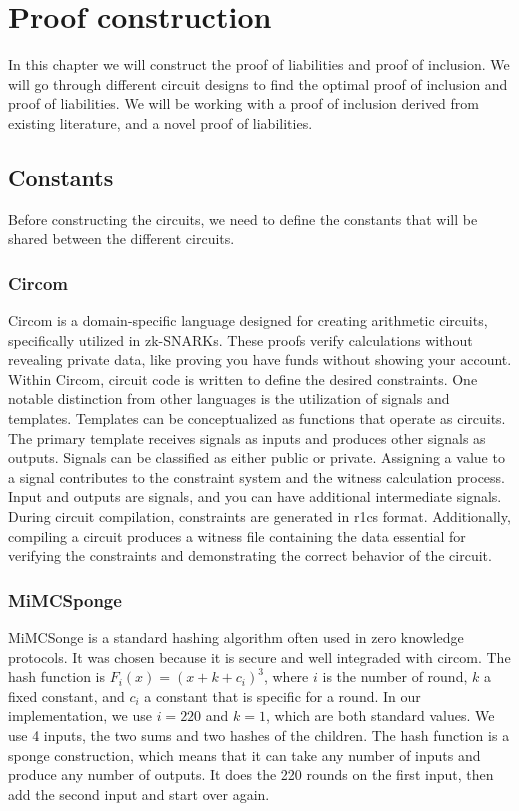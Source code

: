 
\chapter{Proof construction}
In this chapter we will construct the proof of liabilities and proof of inclusion. We will go through different circuit designs to find the optimal proof of inclusion and proof of liabilities.
We will be working with a proof of inclusion derived from existing literature, and a novel proof of liabilities.

\section{Constants}
Before constructing the circuits, we need to define the constants that will be shared between the
different circuits.


\subsection{Circom} 

Circom is a domain-specific language designed for creating arithmetic circuits, specifically utilized in zk-SNARKs. These proofs verify calculations without revealing private data, like proving you have funds without showing your account.
Within Circom, circuit code is written to define the desired constraints. One notable distinction from other languages is the utilization of signals and templates.
Templates can be conceptualized as functions that operate as circuits. The primary template receives signals as inputs and produces other signals as outputs. Signals can be classified as either public or private.
Assigning a value to a signal contributes to the constraint system and the witness calculation process.
Input and outputs are signals, and you can have additional intermediate signals.
During circuit compilation, constraints are generated in r1cs format. Additionally, compiling a circuit produces a witness file containing the data essential for verifying the constraints and demonstrating the correct behavior of the circuit.

\subsection{MiMCSponge} 
MiMCSonge is a standard hashing algorithm often used in zero knowledge protocols. It was chosen because it is secure and well integraded with circom.
The hash function is $F_i(x) = (x + k + c_i)^3$, where $i$ is the number of round, $k$ a fixed constant, and $c_i$ a constant that is specific for a round.
In our implementation, we use $i = 220$ and $k = 1$, which are both standard values. We use 4 inputs, the two sums and two hashes of the children. 
The hash function is a sponge construction, which means that it can take any number of inputs and produce any number of outputs. It does the 220 rounds on the first input, then add the second input and start over again.


